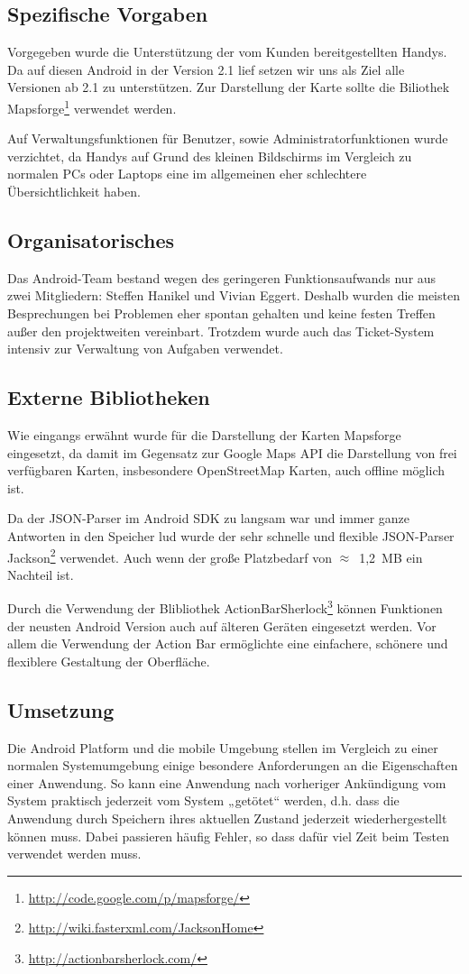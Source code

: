 \subsection*{Spezifische Vorgaben}
Vorgegeben wurde die Unterstützung der vom Kunden bereitgestellten Handys. Da auf diesen Android in der Version 2.1 lief setzen wir uns als Ziel alle Versionen ab 2.1 zu unterstützen. Zur Darstellung der Karte sollte die Biliothek Mapsforge\footnote{\url{http://code.google.com/p/mapsforge/}} verwendet werden.

Auf Verwaltungsfunktionen für Benutzer, sowie Administratorfunktionen wurde verzichtet, da Handys auf Grund des kleinen Bildschirms im Vergleich zu normalen PCs oder Laptops eine im allgemeinen eher schlechtere Übersichtlichkeit haben.

\subsection*{Organisatorisches}
Das Android-Team bestand wegen des geringeren Funktionsaufwands nur aus zwei Mitgliedern: Steffen Hanikel und Vivian Eggert. Deshalb wurden die meisten Besprechungen bei Problemen eher spontan gehalten und keine festen Treffen außer den projektweiten vereinbart. Trotzdem wurde auch das Ticket-System intensiv zur Verwaltung von Aufgaben verwendet.

\subsection*{Externe Bibliotheken}
Wie eingangs erwähnt wurde für die Darstellung der Karten Mapsforge eingesetzt, da damit im Gegensatz zur Google Maps API die Darstellung von frei verfügbaren Karten, insbesondere OpenStreetMap Karten, auch offline möglich ist.

Da der JSON-Parser im Android SDK zu langsam war und immer ganze Antworten in den Speicher lud wurde der sehr schnelle und flexible JSON-Parser Jackson\footnote{\url{http://wiki.fasterxml.com/JacksonHome}} verwendet. Auch wenn der große Platzbedarf von $\approx$~1,2~MB ein Nachteil ist.

Durch die Verwendung der Blibliothek ActionBarSherlock\footnote{\url{http://actionbarsherlock.com/}} können Funktionen der neusten Android Version auch auf älteren Geräten eingesetzt werden. Vor allem die Verwendung der Action Bar ermöglichte eine einfachere, schönere und flexiblere Gestaltung der Oberfläche.
	
\subsection*{Umsetzung}
Die Android Platform und die mobile Umgebung stellen im Vergleich zu einer normalen Systemumgebung einige besondere Anforderungen an die Eigenschaften einer Anwendung. So kann eine Anwendung nach vorheriger Ankündigung vom System praktisch jederzeit vom System „getötet“ werden, d.h. dass die Anwendung durch Speichern ihres aktuellen Zustand jederzeit wiederhergestellt können muss. Dabei passieren häufig Fehler, so dass dafür viel Zeit beim Testen verwendet werden muss.

